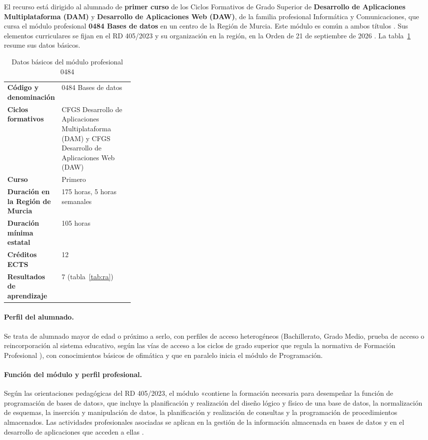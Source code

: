 \documentclass[11pt,a4paper]{article}
\begin{document}
El recurso está dirigido al alumnado de \textbf{primer curso} de los Ciclos Formativos de
Grado Superior de \textbf{Desarrollo de Aplicaciones Multiplataforma (DAM)} y
\textbf{Desarrollo de Aplicaciones Web (DAW)}, de la familia profesional Informática y
Comunicaciones, que cursa el módulo profesional \textbf{0484 Bases de datos} en un centro de
la Región de Murcia. Este módulo es común a ambos títulos \cite{rd450,rd686,rd405,rd500}.
Sus elementos curriculares se fijan en el RD 405/2023 \cite{rd405} y su organización en la
región, en la Orden de 21 de septiembre de 2026 \cite{murcia2026}. La
tabla~\ref{tab:modulo} resume sus datos básicos.

\begin{table}[H]
\centering
\begin{tabularx}{\linewidth}{@{}>{\bfseries}p{0.3\linewidth}X@{}}
\toprule
Código y denominación & 0484 Bases de datos \\
Ciclos formativos & CFGS Desarrollo de Aplicaciones Multiplataforma (DAM) y CFGS
                    Desarrollo de Aplicaciones Web (DAW) \\
Curso & Primero \cite[anexos XLIV y XLV]{murcia2026} \\
Duración en la Región de Murcia & 175 horas, 5 horas semanales
                    \cite[anexos XLIV y XLV]{murcia2026} \\
Duración mínima estatal & 105 horas \cite{rd405} \\
Créditos ECTS & 12 \cite{rd405} \\
Resultados de aprendizaje & 7 (tabla~\ref{tab:ra}) \\
\bottomrule
\end{tabularx}
\caption{Datos básicos del módulo profesional 0484}
\label{tab:modulo}
\end{table}

\paragraph{Perfil del alumnado.} Se trata de alumnado mayor de edad o próximo a serlo, con
perfiles de acceso heterogéneos (Bachillerato, Grado Medio, prueba de acceso o
reincorporación al sistema educativo, según las vías de acceso a los ciclos de grado
superior que regula la normativa de Formación Profesional \cite{lofp,rd659}), con
conocimientos básicos de ofimática y que en paralelo inicia el módulo de Programación.

\paragraph{Función del módulo y perfil profesional.} Según las orientaciones pedagógicas del
RD 405/2023, el módulo «contiene la formación necesaria para desempeñar la función de
programación de bases de datos», que incluye la planificación y realización del diseño
lógico y físico de una base de datos, la normalización de esquemas, la inserción y
manipulación de datos, la planificación y realización de consultas y la programación de
procedimientos almacenados. Las actividades profesionales asociadas se aplican en la gestión
de la información almacenada en bases de datos y en el desarrollo de aplicaciones que acceden
a ellas \cite{rd405}.
\end{document}
